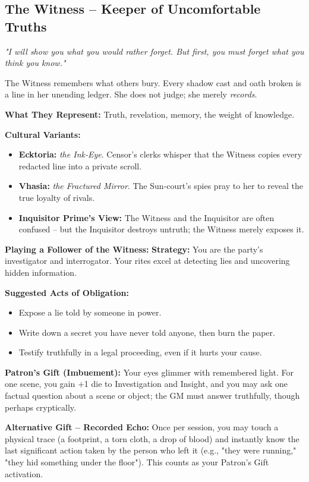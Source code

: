 \documentclass[10pt,a5paper]{book}
\begin{document}
\subsection{The Witness -- Keeper of Uncomfortable Truths}
\label{patron:witness}

\textit{"I will show you what you would rather forget. But first, you must forget what you think you know."}

The Witness remembers what others bury. Every shadow cast and oath broken is a line in her unending ledger. She does not judge; she merely \textit{records}.

\textbf{What They Represent:} Truth, revelation, memory, the weight of knowledge.

\textbf{Cultural Variants:}
\begin{itemize}
    \item \textbf{Ecktoria:} \textit{the Ink‑Eye}. Censor's clerks whisper that the Witness copies every redacted line into a private scroll.
    \item \textbf{Vhasia:} \textit{the Fractured Mirror}. The Sun‑court's spies pray to her to reveal the true loyalty of rivals.
    \item \textbf{Inquisitor Prime's View:} The Witness and the Inquisitor are often confused -- but the Inquisitor destroys untruth; the Witness merely exposes it.
\end{itemize}

\textbf{Playing a Follower of the Witness:}
\textbf{Strategy:} You are the party's investigator and interrogator. Your rites excel at detecting lies and uncovering hidden information.

\textbf{Suggested Acts of Obligation:}
\begin{itemize}
    \item Expose a lie told by someone in power.
    \item Write down a secret you have never told anyone, then burn the paper.
    \item Testify truthfully in a legal proceeding, even if it hurts your cause.
\end{itemize}

\textbf{Patron's Gift (Imbuement):} Your eyes glimmer with remembered light. For one scene, you gain +1 die to Investigation and Insight, and you may ask one factual question about a scene or object; the GM must answer truthfully, though perhaps cryptically.

\textbf{Alternative Gift -- Recorded Echo:} Once per session, you may touch a physical trace (a footprint, a torn cloth, a drop of blood) and instantly know the last significant action taken by the person who left it (e.g., "they were running," "they hid something under the floor"). This counts as your Patron's Gift activation.
\end{document}
